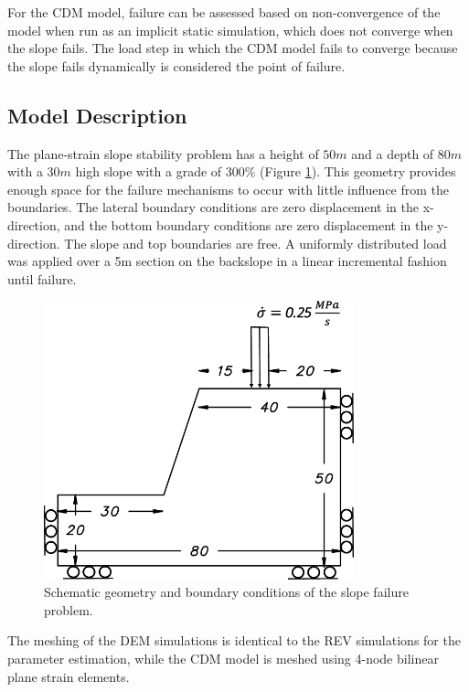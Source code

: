 For the CDM model, failure can be assessed based on non-convergence of the model when run as an implicit static simulation, which does not converge when the slope fails. The load step in which the CDM model fails to converge because the slope fails dynamically is considered the point of failure.

\subsection{Model Description}

The plane-strain slope stability problem has a height of $50m$ and a depth of $80m$ with a $30m$ high slope with a grade of $300\%$ (Figure \ref{fig:slopeGeom}). This geometry provides enough space for the failure mechanisms to occur with little influence from the boundaries. The lateral boundary conditions are zero displacement in the x-direction, and the bottom boundary conditions are zero displacement in the y-direction. The slope and top boundaries are free. A uniformly distributed load was applied over a 5m section on the backslope in a linear incremental fashion until failure.

\begin{figure}[!htb]
\begin{center}
\includegraphics[width=0.8\textwidth]{figures/Chapter5/SlopeSchematic}
\caption{{\label{fig:slopeGeom} Schematic geometry and boundary conditions of the slope failure problem.%
}}
\end{center}
\end{figure}

The meshing of the DEM simulations is identical to the REV simulations for the parameter estimation, while the CDM model is meshed using 4-node bilinear plane strain elements.

